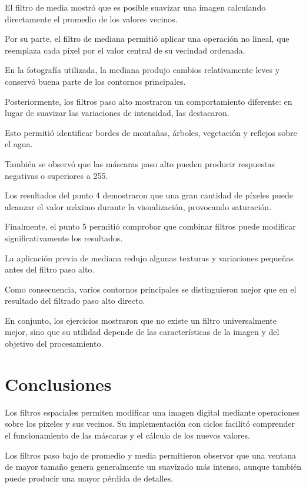 \documentclass[11pt,letterpaper]{article}
\begin{document}
El filtro de media mostró que es posible
suavizar una imagen calculando directamente
el promedio de los valores vecinos.

Por su parte, el filtro de mediana
permitió aplicar una operación no lineal,
que reemplaza cada píxel por el valor
central de su vecindad ordenada.

En la fotografía utilizada,
la mediana produjo cambios relativamente
leves y conservó buena parte de los
contornos principales.

Posteriormente, los filtros paso alto
mostraron un comportamiento diferente:
en lugar de suavizar las variaciones
de intensidad, las destacaron.

Esto permitió identificar bordes
de montañas, árboles, vegetación
y reflejos sobre el agua.

También se observó que las máscaras
paso alto pueden producir respuestas
negativas o superiores a 255.

Los resultados del punto 4 demostraron
que una gran cantidad de píxeles
puede alcanzar el valor máximo
durante la visualización,
provocando saturación.

Finalmente, el punto 5 permitió
comprobar que combinar filtros
puede modificar significativamente
los resultados.

La aplicación previa de mediana
redujo algunas texturas y variaciones
pequeñas antes del filtro paso alto.

Como consecuencia, varios contornos
principales se distinguieron mejor
que en el resultado del filtrado
paso alto directo.

En conjunto, los ejercicios mostraron
que no existe un filtro universalmente
mejor, sino que su utilidad depende
de las características de la imagen
y del objetivo del procesamiento.

\section{Conclusiones}

Los filtros espaciales permiten modificar
una imagen digital mediante operaciones
sobre los píxeles y sus vecinos.
Su implementación con ciclos facilitó
comprender el funcionamiento de las máscaras
y el cálculo de los nuevos valores.

Los filtros paso bajo de promedio y media
permitieron observar que una ventana
de mayor tamaño genera generalmente
un suavizado más intenso,
aunque también puede producir
una mayor pérdida de detalles.
\end{document}
